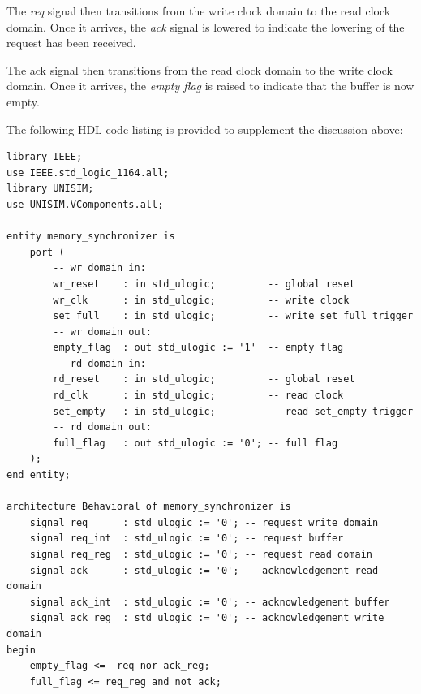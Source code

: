         The {\it req} signal then transitions from the write clock domain to the read clock domain. Once it arrives, the {\it ack} signal is lowered to indicate the lowering of the request has been received.

        The {ack} signal then transitions from the read clock domain to the write clock domain. Once it arrives, the {\it empty flag} is raised to indicate that the buffer is now empty.

        The following HDL code listing is provided to supplement the discussion above:
        \begin{verbatim}
library IEEE;
use IEEE.std_logic_1164.all;
library UNISIM;
use UNISIM.VComponents.all;

entity memory_synchronizer is
    port (
        -- wr domain in:
        wr_reset    : in std_ulogic;         -- global reset
        wr_clk      : in std_ulogic;         -- write clock
        set_full    : in std_ulogic;         -- write set_full trigger
        -- wr domain out:
        empty_flag  : out std_ulogic := '1'  -- empty flag
        -- rd domain in:
        rd_reset    : in std_ulogic;         -- global reset
        rd_clk      : in std_ulogic;         -- read clock
        set_empty   : in std_ulogic;         -- read set_empty trigger
        -- rd domain out:
        full_flag   : out std_ulogic := '0'; -- full flag
    );
end entity;

architecture Behavioral of memory_synchronizer is
    signal req      : std_ulogic := '0'; -- request write domain
    signal req_int  : std_ulogic := '0'; -- request buffer
    signal req_reg  : std_ulogic := '0'; -- request read domain
    signal ack      : std_ulogic := '0'; -- acknowledgement read domain
    signal ack_int  : std_ulogic := '0'; -- acknowledgement buffer
    signal ack_reg  : std_ulogic := '0'; -- acknowledgement write domain
begin
    empty_flag <=  req nor ack_reg;
    full_flag <= req_reg and not ack;


\end{verbatim}
